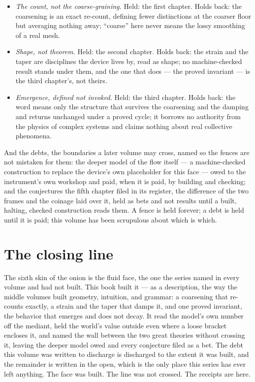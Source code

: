 \begin{itemize}
a claim about any real particle, and the reading widens no further.
\item \emph{The count, not the coarse-graining.} Held: the first chapter. Holds
back: the coarsening is an exact re-count, defining fewer distinctions at the
coarser floor but averaging nothing away; ``coarse'' here never means the lossy
smoothing of a real mesh.
\item \emph{Shape, not theorem.} Held: the second chapter. Holds back: the strain
and the taper are disciplines the device lives by, read as shape; no
machine-checked result stands under them, and the one that does --- the proved
invariant --- is the third chapter's, not theirs.
\item \emph{Emergence, defined not invoked.} Held: the third chapter. Holds back:
the word means only the structure that survives the coarsening and the damping and
returns unchanged under a proved cycle; it borrows no authority from the physics
of complex systems and claims nothing about real collective phenomena.
\end{itemize}

And the debts, the boundaries a later volume may cross, named so the fences are
not mistaken for them: the deeper model of the flow itself --- a machine-checked
construction to replace the device's own placeholder for this face --- owed to
the instrument's own workshop and paid, when it is paid, by building and checking;
and the conjectures the fifth chapter filed in its register, the difference of the
two frames and the coinage laid over it, held as bets and not results until a
built, halting, checked construction reads them. A fence is held forever; a debt
is held until it is paid; this volume has been scrupulous about which is which.

\section*{The closing line}

The sixth skin of the onion is the fluid face, the one the series named in every
volume and had not built. This book built it --- as a description, the way the
middle volumes built geometry, intuition, and grammar: a coarsening that
re-counts exactly, a strain and the taper that damps it, and one proved
invariant, the behavior that emerges and does not decay. It read the model's own
number off the mediant, held the world's value outside even where a loose bracket
encloses it, and named the wall between the two great theories without crossing
it, leaving the deeper model owed and every conjecture filed as a bet. The debt
this volume was written to discharge is discharged to the extent it was built, and
the remainder is written in the open, which is the only place this series has ever
left anything. The face was built. The line was not crossed. The receipts are
here.
